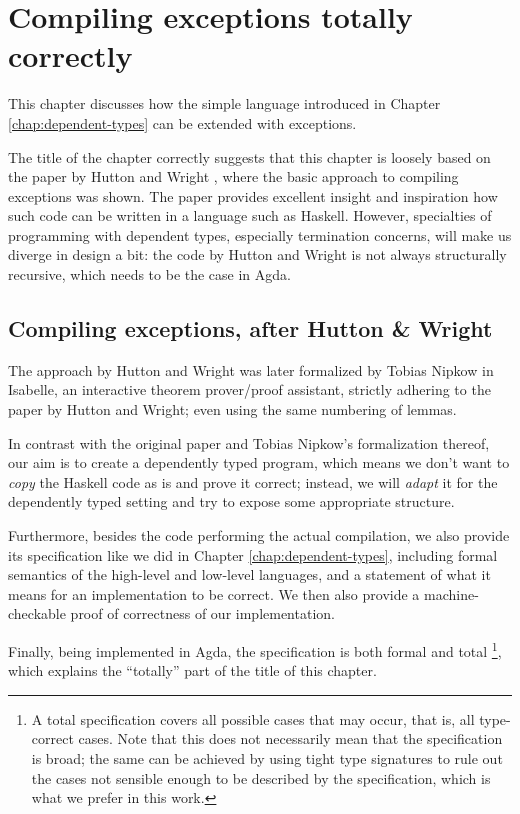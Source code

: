 \chapter{Compiling exceptions totally correctly}
\label{chap:execution}

This chapter discusses how the simple language introduced in Chapter \ref{chap:dependent-types}
can be extended with exceptions.

The title of the chapter correctly suggests that this chapter is loosely based on the paper by
Hutton and Wright \cite{gmh:exceptions}, where the basic approach to compiling exceptions
was shown.
The paper provides excellent insight and inspiration how such code can be written
in a language such as Haskell. However, specialties of programming with dependent types,
especially termination concerns, will make us diverge in design a bit: the code by Hutton and
Wright is not always structurally recursive, which needs to be the case in Agda.

\section{Compiling exceptions, after Hutton \& Wright}

The approach by Hutton and Wright was
later formalized by Tobias Nipkow \cite{nipkow} in Isabelle, an interactive
theorem prover/proof assistant, strictly adhering to the paper by Hutton and Wright;
even using the same numbering of lemmas.

In contrast with the original paper and Tobias Nipkow's formalization thereof,
our aim is to create a dependently typed program, which means we don't want to
\emph{copy} the Haskell code as is and prove it correct; instead, we will
\emph{adapt} it for the dependently typed setting and try to expose some appropriate
structure.

Furthermore, besides the code performing the actual compilation, we also
provide its specification like we did in Chapter \ref{chap:dependent-types},
including formal semantics of the high-level and low-level languages, and a statement of what
it means for an implementation to be correct. We then also provide a machine-checkable proof
of correctness of our implementation.

Finally, being implemented in Agda, the specification is both formal and total%
\footnote{A total specification covers all possible cases that may occur, that is,
all type-correct cases. Note that this does not necessarily mean that the specification
is broad; the same can be achieved by using tight type signatures to rule out the cases
not sensible enough to be described by the specification, which is what
we prefer in this work.}, which explains the
``totally'' part of the title of this chapter.

